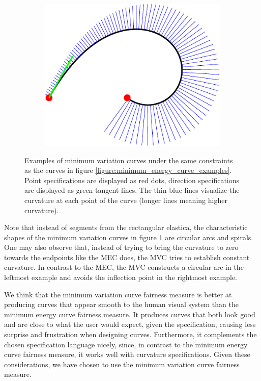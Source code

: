 \documentclass[a4paper]{article}
\begin{document}
\begin{figure}[htb]
\begin{subfigure}[b]{\textwidth / 3}
					\end{subfigure}%
					\begin{subfigure}[b]{\textwidth / 3}
						\includegraphics[width=\textwidth]{content/output/fairness_mvc_3.pdf}
					\end{subfigure}
					\caption{Examples of minimum variation curves under the same constraints as the curves in figure \ref{figure:minimum_energy_curve_examples}. Point specifications are displayed as red dots, direction specifications are displayed as green tangent lines. The thin blue lines visualize the curvature at each point of the curve (longer lines meaning higher curvature).}
					\label{figure:minimum_variation_curve_examples}
				\end{figure}

				Note that instead of segments from the rectangular elastica, the characteristic shapes of the minimum variation curves in figure \ref{figure:minimum_variation_curve_examples} are circular arcs and spirals. One may also observe that, instead of trying to bring the curvature to zero towards the endpoints like the MEC does, the MVC tries to establish constant curvature. In contrast to the MEC, the MVC constructs a circular arc in the leftmost example and avoids the inflection point in the rightmost example.

				We think that the minimum variation curve fairness measure is better at producing curves that appear smooth to the human visual system than the minimum energy curve fairness measure. It produces curves that both look good and are close to what the user would expect, given the specification, causing less surprise and frustration when designing curves. Furthermore, it complements the chosen specification language nicely, since, in contrast to the minimum energy curve fairness measure, it works well with curvature specifications. Given these considerations, we have chosen to use the minimum variation curve fairness measure.
\end{document}
